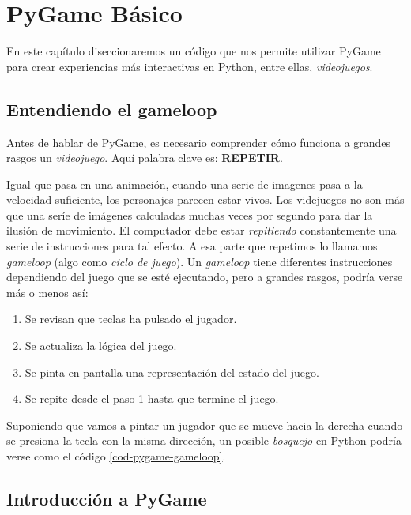 \chapter{PyGame Básico}
\label{chap:pygame}

En este capítulo diseccionaremos un código que nos permite utilizar PyGame para crear experiencias más interactivas en Python, entre ellas, \emph{videojuegos}.

\section{Entendiendo el gameloop}

Antes de hablar de PyGame, es necesario comprender cómo funciona a grandes rasgos un \emph{videojuego}. Aquí palabra clave es: \textbf{REPETIR}.

Igual que pasa en una animación, cuando una serie de imagenes pasa a la velocidad suficiente, los personajes parecen estar vivos. Los videjuegos no son más que una seríe de imágenes calculadas muchas veces por segundo para dar la ilusión de movimiento. El computador debe estar \emph{repitiendo} constantemente una serie de instrucciones para tal efecto. A esa parte que repetimos lo llamamos \emph{gameloop} (algo como \emph{ciclo de juego}). Un \emph{gameloop} tiene diferentes instrucciones dependiendo del juego que se esté ejecutando, pero a grandes rasgos, podría verse más o menos así:

\begin{enumerate}
\item Se revisan que teclas ha pulsado el jugador.
\item Se actualiza la lógica del juego.
\item Se pinta en pantalla una representación del estado del juego.
\item Se repite desde el paso 1 hasta que termine el juego.
\end{enumerate}

\newpage

Suponiendo que vamos a pintar un jugador que se mueve hacia la derecha cuando se presiona la tecla con la misma dirección, un posible \emph{bosquejo} en Python podría verse como el código \ref{cod-pygame-gameloop}. 





\section{Introducción a PyGame}

